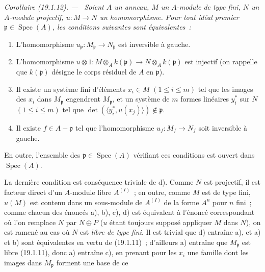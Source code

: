 \documentclass[10pt,oneside]{book}
\makeatletter
\newcommand{\setmanualcurrentlabel}[1]{\def\@currentlabel{#1}}
\newcommand{\oldpage}[2][]{%
  \setcounter{footnote}{0}%
  \marginpar{\scriptsize\textbf{#1}~|~#2}\ignorespaces}
\newenvironment{corollary}[1][]{%
  \setmanualcurrentlabel{#1}\par\medskip\noindent\itshape Corollaire (#1). ---\ }{\par}
\makeatother
\begin{document}
\begin{corollary}[19.1.12]
\label{0.19.1.12-fr}
Soient $A$ un anneau, $M$ un $A$-module de type fini, $N$ un $A$-module
projectif, $u:M\to N$ un homomorphisme. Pour tout idéal premier
$\mathfrak p\in\operatorname{Spec}(A)$, les conditions suivantes sont
équivalentes~:
\begin{enumerate}
  \item[a)] L'homomorphisme
  $u_{\mathfrak p}:M_{\mathfrak p}\to N_{\mathfrak p}$ est inversible à
  gauche.
  \item[b)] L'homomorphisme
  $u\otimes1:M\otimes_Ak(\mathfrak p)\to N\otimes_Ak(\mathfrak p)$ est
  injectif (on rappelle que $k(\mathfrak p)$ désigne le corps résiduel de $A$
  en $\mathfrak p$).
  \item[c)] Il existe un système fini d'éléments $x_i\in M$
  $(1\leq i\leq m)$ tel que les images des $x_i$ dans $M_{\mathfrak p}$
  engendrent $M_{\mathfrak p}$, et un système de $m$ formes linéaires
  $y_i^*$ sur $N$ $(1\leq i\leq m)$ tel que
  $\det(\langle y_i^*,u(x_j)\rangle)\notin\mathfrak p$.
  \item[d)] Il existe $f\in A-\mathfrak p$ tel que l'homomorphisme
  $u_f:M_f\to N_f$ soit inversible à gauche.
\end{enumerate}
En outre, l'ensemble des $\mathfrak p\in\operatorname{Spec}(A)$ vérifiant ces
conditions est ouvert dans $\operatorname{Spec}(A)$.
\end{corollary}

La dernière condition est conséquence triviale de d). Comme $N$ est
projectif, il est facteur direct d'un $A$-module libre $A^{(I)}$~; en outre,
comme $M$ est de type fini, $u(M)$ est contenu dans un sous-module de $A^{(I)}$
de la forme $A^n$ pour $n$ fini~; comme chacun des énoncés a), b), c), d) est
équivalent à l'énoncé correspondant où l'on remplace $N$ par $N\oplus P$ ($u$
étant toujours supposé appliquer $M$ dans $N$), on est ramené au cas où $N$
est \emph{libre de type fini}. Il est trivial que d) entraîne a), et a) et b)
sont équivalentes en vertu de (19.1.11)~; d'ailleurs a) entraîne que
$M_{\mathfrak p}$ est libre (19.1.11), donc a) entraîne c), en prenant pour les
$x_i$ une famille dont les images dans $M_{\mathfrak p}$ forment une base de ce

\oldpage[0\textsubscript{IV-1}]{77}
\end{document}

